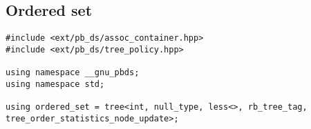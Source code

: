 \subsection{Ordered set}
\begin{lstlisting}
#include <ext/pb_ds/assoc_container.hpp>
#include <ext/pb_ds/tree_policy.hpp>

using namespace __gnu_pbds;
using namespace std;

using ordered_set = tree<int, null_type, less<>, rb_tree_tag, tree_order_statistics_node_update>;
\end{lstlisting}